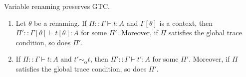 
Variable renaming preserves GTC.

\begin{proposition}
\label{prop:renaming}
  \begin{enumerate}
  \item\label{prop:renaming1}
    Let $\theta$ be a renaming.
    If $\Pi::\Gamma\vdash t:A$ and $\Gamma[\theta]$ is a context, 
    then $\Pi'::\Gamma[\theta]\vdash t[\theta]:A$ for some $\Pi'$.
    Moreover, if $\Pi$ satisfies the global trace condition, so does $\Pi'$.
  \item\label{prop:renaming2}
    If $\Pi::\Gamma\vdash t:A$ and $t' \sim_\alpha t$,
    then $\Pi'::\Gamma\vdash t':A$ for some $\Pi'$.
    Moreover, if $\Pi$ satisfies the global trace condition, so does $\Pi'$.
  \end{enumerate}
\end{proposition}


